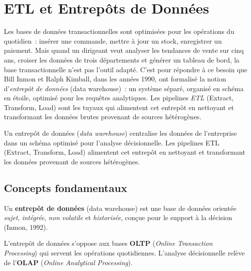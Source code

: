 \chapter{ETL et Entrep\^ots de Donn\'ees}
\label{ch:etl}

Les bases de donn\'ees transactionnelles sont optimis\'ees pour les op\'erations du quotidien~: ins\'erer une commande, mettre \`a jour un stock, enregistrer un paiement. Mais quand un dirigeant veut analyser les tendances de vente sur cinq ans, croiser les donn\'ees de trois d\'epartements et g\'en\'erer un tableau de bord, la base transactionnelle n'est pas l'outil adapt\'e. C'est pour r\'epondre \`a ce besoin que Bill Inmon et Ralph Kimball, dans les ann\'ees 1990, ont formalis\'e la notion d'\emph{entrep\^ot de donn\'ees} (data warehouse)~: un syst\`eme s\'epar\'e, organis\'e en sch\'ema en \'etoile, optimis\'e pour les requ\^etes analytiques. Les pipelines \emph{ETL} (Extract, Transform, Load) sont les tuyaux qui alimentent cet entrep\^ot en nettoyant et transformant les donn\'ees brutes provenant de sources h\'et\'erog\`enes.

\begin{intuition}[title=\textbf{Id\'ee centrale}]
Un entrep\^ot de donn\'ees (\emph{data warehouse}) centralise les donn\'ees
de l'entreprise dans un sch\'ema optimis\'e pour l'analyse d\'ecisionnelle.
Les pipelines ETL (Extract, Transform, Load) alimentent cet entrep\^ot en
nettoyant et transformant les donn\'ees provenant de sources h\'et\'erog\`enes.
\end{intuition}

\section{Concepts fondamentaux}

\begin{definition}
Un \textbf{entrep\^ot de donn\'ees} (data warehouse) est une base de donn\'ees
orient\'ee \emph{sujet}, \emph{int\'egr\'ee}, \emph{non volatile} et
\emph{historis\'ee}, con\c{c}ue pour le support \`a la d\'ecision (Inmon, 1992).
\end{definition}

\begin{remarque}
L'entrep\^ot de donn\'ees s'oppose aux bases \textbf{OLTP}
(\emph{Online Transaction Processing}) qui servent les op\'erations
quotidiennes. L'analyse d\'ecisionnelle rel\`eve de l'\textbf{OLAP}
(\emph{Online Analytical Processing}).
\end{remarque}

